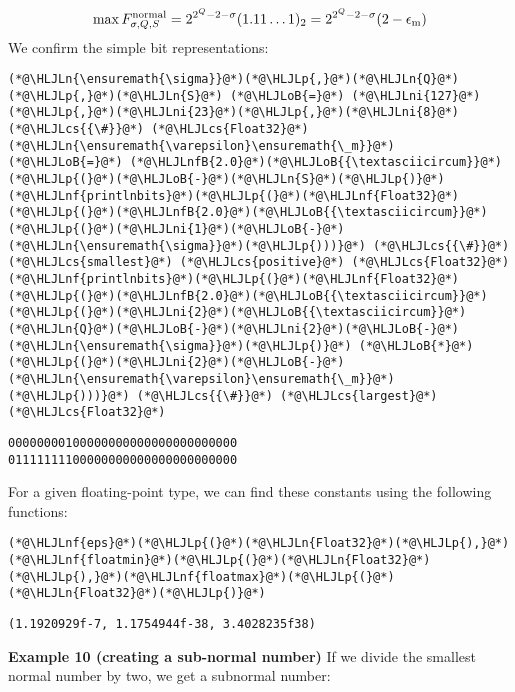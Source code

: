 \documentclass[12pt,a4paper]{article}
\newcommand{\HLJLn}[1]{#1}
\newcommand{\HLJLnf}[1]{\textcolor[RGB]{66,102,213}{#1}}
\newcommand{\HLJLnfB}[1]{\textcolor[RGB]{59,151,46}{#1}}
\newcommand{\HLJLni}[1]{\textcolor[RGB]{59,151,46}{#1}}
\newcommand{\HLJLoB}[1]{\textcolor[RGB]{102,102,102}{\textbf{#1}}}
\newcommand{\HLJLp}[1]{#1}
\newcommand{\HLJLcs}[1]{\textcolor[RGB]{153,153,119}{\textit{#1}}}
\begin{document}
\[
\max F_{\ensuremath{\sigma},Q,S}^{\rm normal} = 2^{2^Q-2-\ensuremath{\sigma}} (1.11\ldots1)_2 = 2^{2^Q-2-\ensuremath{\sigma}} (2-\ensuremath{\epsilon}_{\rm m})
\]
We confirm the simple bit representations:


\begin{lstlisting}
(*@\HLJLn{\ensuremath{\sigma}}@*)(*@\HLJLp{,}@*)(*@\HLJLn{Q}@*)(*@\HLJLp{,}@*)(*@\HLJLn{S}@*) (*@\HLJLoB{=}@*) (*@\HLJLni{127}@*)(*@\HLJLp{,}@*)(*@\HLJLni{23}@*)(*@\HLJLp{,}@*)(*@\HLJLni{8}@*) (*@\HLJLcs{{\#}}@*) (*@\HLJLcs{Float32}@*)
(*@\HLJLn{\ensuremath{\varepsilon}\ensuremath{\_m}}@*) (*@\HLJLoB{=}@*) (*@\HLJLnfB{2.0}@*)(*@\HLJLoB{{\textasciicircum}}@*)(*@\HLJLp{(}@*)(*@\HLJLoB{-}@*)(*@\HLJLn{S}@*)(*@\HLJLp{)}@*)
(*@\HLJLnf{printlnbits}@*)(*@\HLJLp{(}@*)(*@\HLJLnf{Float32}@*)(*@\HLJLp{(}@*)(*@\HLJLnfB{2.0}@*)(*@\HLJLoB{{\textasciicircum}}@*)(*@\HLJLp{(}@*)(*@\HLJLni{1}@*)(*@\HLJLoB{-}@*)(*@\HLJLn{\ensuremath{\sigma}}@*)(*@\HLJLp{)))}@*) (*@\HLJLcs{{\#}}@*) (*@\HLJLcs{smallest}@*) (*@\HLJLcs{positive}@*) (*@\HLJLcs{Float32}@*)
(*@\HLJLnf{printlnbits}@*)(*@\HLJLp{(}@*)(*@\HLJLnf{Float32}@*)(*@\HLJLp{(}@*)(*@\HLJLnfB{2.0}@*)(*@\HLJLoB{{\textasciicircum}}@*)(*@\HLJLp{(}@*)(*@\HLJLni{2}@*)(*@\HLJLoB{{\textasciicircum}}@*)(*@\HLJLn{Q}@*)(*@\HLJLoB{-}@*)(*@\HLJLni{2}@*)(*@\HLJLoB{-}@*)(*@\HLJLn{\ensuremath{\sigma}}@*)(*@\HLJLp{)}@*) (*@\HLJLoB{*}@*) (*@\HLJLp{(}@*)(*@\HLJLni{2}@*)(*@\HLJLoB{-}@*)(*@\HLJLn{\ensuremath{\varepsilon}\ensuremath{\_m}}@*)(*@\HLJLp{)))}@*) (*@\HLJLcs{{\#}}@*) (*@\HLJLcs{largest}@*) (*@\HLJLcs{Float32}@*)
\end{lstlisting}

\begin{lstlisting}
00000000100000000000000000000000
01111111100000000000000000000000
\end{lstlisting}


For a given floating-point type, we can find these constants using the following functions:


\begin{lstlisting}
(*@\HLJLnf{eps}@*)(*@\HLJLp{(}@*)(*@\HLJLn{Float32}@*)(*@\HLJLp{),}@*)(*@\HLJLnf{floatmin}@*)(*@\HLJLp{(}@*)(*@\HLJLn{Float32}@*)(*@\HLJLp{),}@*)(*@\HLJLnf{floatmax}@*)(*@\HLJLp{(}@*)(*@\HLJLn{Float32}@*)(*@\HLJLp{)}@*)
\end{lstlisting}

\begin{lstlisting}
(1.1920929f-7, 1.1754944f-38, 3.4028235f38)
\end{lstlisting}


\textbf{Example 10 (creating a sub-normal number)} If we divide the smallest normal number by two, we get a subnormal number:
\end{document}
